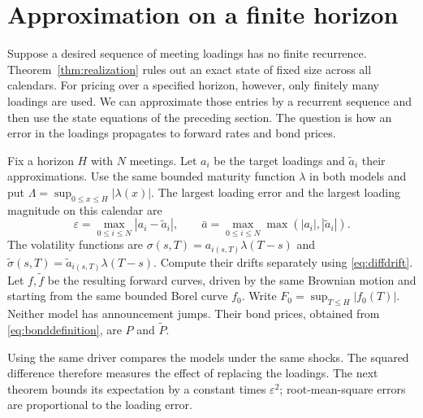 \section{Approximation on a finite horizon}\label{sec:approximation}
Suppose a desired sequence of meeting loadings has no finite recurrence. Theorem~\ref{thm:realization} rules out an exact state of fixed size across all calendars. For pricing over a specified horizon, however, only finitely many loadings are used. We can approximate those entries by a recurrent sequence and then use the state equations of the preceding section. The question is how an error in the loadings propagates to forward rates and bond prices.

Fix a horizon $H$ with $N$ meetings. Let $a_i$ be the target loadings and $\widetilde a_i$ their approximations. Use the same bounded maturity function $\lambda$ in both models and put $\Lambda=\sup_{0\le x\le H}|\lambda(x)|$. The largest loading error and the largest loading magnitude on this calendar are
\begin{equation}
\varepsilon=\max_{0\le i\le N}|a_i-\widetilde a_i|,\qquad
\bar a=\max_{0\le i\le N}\max(|a_i|,|\widetilde a_i|).\label{eq:loaderror}
\end{equation}
The volatility functions are $\sigma(s,T)=a_{i(s,T)}\lambda(T-s)$ and $\widetilde\sigma(s,T)=\widetilde a_{i(s,T)}\lambda(T-s)$. Compute their drifts separately using \eqref{eq:diffdrift}. Let $f,\widetilde f$ be the resulting forward curves, driven by the same Brownian motion and starting from the same bounded Borel curve $f_0$. Write $F_0=\sup_{T\le H}|f_0(T)|$. Neither model has announcement jumps. Their bond prices, obtained from \eqref{eq:bonddefinition}, are $P$ and $\widetilde P$.

Using the same driver compares the models under the same shocks. The squared difference therefore measures the effect of replacing the loadings. The next theorem bounds its expectation by a constant times $\varepsilon^2$; root-mean-square errors are proportional to the loading error.

